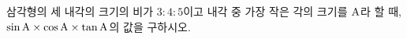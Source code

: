 삼각형의 세 내각의 크기의 비가 $3:4:5$이고 내각 중 가장 작은 각의 크기를 $\mathrm{A}$라 할 때, $\sin\mathrm{A}\times\cos\mathrm{A}\times\tan\mathrm{A}$의 값을 구하시오.
